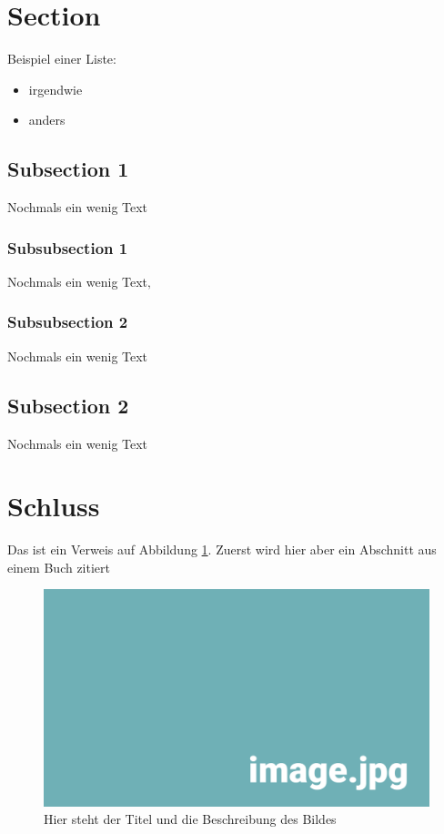 
\section{Section}

Beispiel einer Liste:

\begin{itemize} 
	\item irgendwie 
	\item anders
\end{itemize}


\subsection{Subsection 1}
Nochmals ein wenig Text

\subsubsection{Subsubsection 1}
Nochmals ein wenig Text‚

\subsubsection{Subsubsection 2}
Nochmals ein wenig Text

\subsection{Subsection 2}
Nochmals ein wenig Text

\section{Schluss}

Das ist ein Verweis auf Abbildung \ref{pic:DasBild}. Zuerst wird hier aber ein Abschnitt aus einem Buch  zitiert\\

\begin{figure}[h!]
	\centering

	\includegraphics[width=\textwidth]{img/image.jpg}

	\caption[Hier steht der Titel des Bildes]{Hier steht der Titel und die Beschreibung des Bildes}
	\label{pic:DasBild}
\end{figure}
